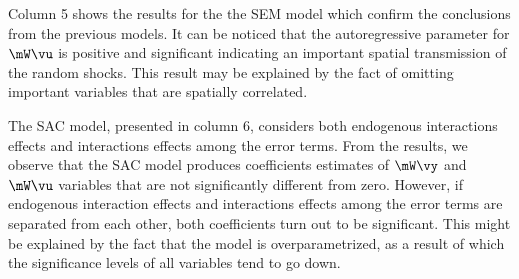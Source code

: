 \documentclass[english,12pt]{book}\usepackage[]{graphicx}\usepackage[]{xcolor}
\begin{document}
Column 5 shows the results for the the SEM model which confirm the conclusions from the previous models. It can be noticed that the autoregressive parameter for $\mW\vu$ is positive and significant indicating an important spatial transmission of the random shocks. This result may be explained by the fact of omitting important variables that are spatially correlated. 

The SAC model, presented in column 6, considers both endogenous interactions effects and interactions effects among the error terms. From the results, we observe that the SAC model produces coefficients estimates of $\mW\vy$ and $\mW\vu$ variables that are not significantly different from zero. However, if endogenous interaction effects and interactions effects among the error terms are separated from each other, both coefficients turn out to be significant. This might be explained by the fact that the model is overparametrized, as a result of which the significance levels of all variables tend to go down. 
\end{document}
